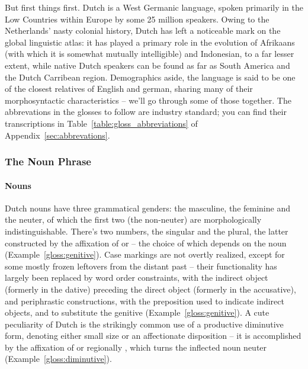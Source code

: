 But first things first.
Dutch is a West Germanic language, spoken primarily in the Low Countries within Europe by some 25 million speakers.
Owing to the Netherlands' nasty colonial history, Dutch has left a noticeable mark on the global linguistic atlas: it has played a primary role in the evolution of Afrikaans (with which it is somewhat mutually intelligible) and Indonesian, to a far lesser extent, while native Dutch speakers can be found as far as South America and the Dutch Carribean region.
Demographics aside, the language is said to be one of the closest relatives of English and german, sharing many of their morphosyntactic characteristics -- we'll go through some of those together.
The abbrevations in the glosses to follow are industry standard; you can find their transcriptions in Table~\ref{table:gloss_abbreviations} of Appendix~\ref{sec:abbrevations}.

\subsubsection{The Noun Phrase}
\paragraph{Nouns}
Dutch nouns have three grammatical genders: the masculine, the feminine and the neuter, of which the first two (the non-neuter) are morphologically indistinguishable.
There's two numbers, the singular and the plural, the latter constructed by the affixation of  or  -- the choice of which depends on the noun (Example~\ref{gloss:genitive}).
Case markings are not overtly realized, except for some mostly frozen leftovers from the distant past -- their functionality has largely been replaced by word order constraints, with the indirect object (formerly in the dative) preceding the direct object (formerly in the accusative), and periphrastic constructions, with the preposition  used to indicate indirect objects, and  to substitute the genitive (Example~\ref{gloss:genitive}).
A cute peculiarity of Dutch is the strikingly common use of a productive diminutive form, denoting either small size or an affectionate disposition -- it is accomplished by the affixation of  or regionally , which turns the inflected noun neuter (Example~\ref{gloss:diminutive}).

